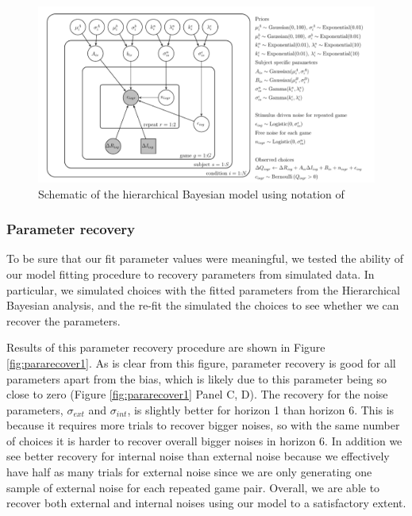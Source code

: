 \documentclass[12pt]{article}
\begin{document}
	\begin{figure}[H]
		\begin{center}
			\includegraphics[width=1\textwidth]{figures/Siyu_EEHorizon_2sigma_final.pdf}
    			\caption{Schematic of the hierarchical Bayesian model using notation of \cite{lee2014}}
			\label{fig:model}
		\end{center}
	\end{figure}
	
	\subsubsection*{Parameter recovery\label{ch:appendix:bayesrecovery}}
	
	To be sure that our fit parameter values were meaningful, we tested the ability of our model fitting procedure to recovery parameters from simulated data.  In particular, we simulated choices with the fitted parameters from the Hierarchical Bayesian analysis, and the re-fit the simulated the choices to see whether we can recover the parameters. 
	
	Results of this parameter recovery procedure are shown in Figure \ref{fig:pararecover1}. As is clear from this figure, parameter recovery is good for all parameters apart from the bias, which is likely due to this parameter being so close to zero (Figure \ref{fig:pararecover1} Panel C, D).  The recovery for the noise parameters, $\sigma_{ext}$ and $\sigma_{int}$, is slightly better for horizon 1 than horizon 6. This is because it requires more trials to recover bigger noises, so with the same number of choices it is harder to recover overall bigger noises in horizon 6. In addition we see better recovery for internal noise than external noise because we effectively have half as many trials for external noise since we are only generating one sample of external noise for each repeated game pair. Overall, we are able to recover both external and internal noises using our model to a satisfactory extent.
	
\end{document}
